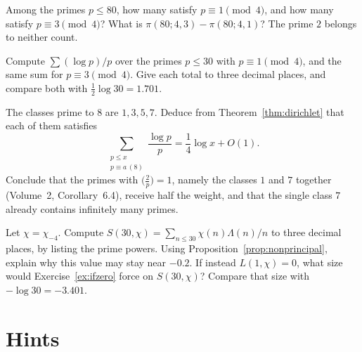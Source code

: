 \begin{exercise}[$\star$]\label{ex:count80}
Among the primes $p\le80$, how many satisfy $p\equiv1\pmod4$, and how many satisfy $p\equiv3\pmod4$? What is $\pi(80;4,3)-\pi(80;4,1)$? The prime $2$ belongs to neither count.
\end{exercise}

\begin{exercise}[$\star\star$]\label{ex:weight30}
Compute $\sum(\log p)/p$ over the primes $p\le30$ with $p\equiv1\pmod4$, and the same sum for $p\equiv3\pmod4$. Give each total to three decimal places, and compare both with $\frac12\log 30=1.701$.
\end{exercise}

\begin{exercise}[$\star\star$]\label{ex:mod8share}
The classes prime to $8$ are $1,3,5,7$. Deduce from Theorem~\ref{thm:dirichlet} that each of them satisfies
\[
\sum_{\substack{p\le x\\p\equiv a\,(8)}}\frac{\log p}p=\frac14\log x+O(1).
\]
Conclude that the primes with $\bigl(\frac2p\bigr)=1$, namely the classes $1$ and $7$ together (Volume~2, Corollary~6.4), receive half the weight, and that the single class $7$ already contains infinitely many primes.
\end{exercise}

\begin{exercise}[$\star\star\star$]\label{ex:schi4}
Let $\chi=\chi_{-4}$. Compute $S(30,\chi)=\sum_{n\le30}\chi(n)\Lambda(n)/n$ to three decimal places, by listing the prime powers. Using Proposition~\ref{prop:nonprincipal}, explain why this value may stay near $-0.2$. If instead $L(1,\chi)=0$, what size would Exercise~\ref{ex:ifzero} force on $S(30,\chi)$? Compare that size with $-\log 30=-3.401$.
\end{exercise}

\section{Hints}

